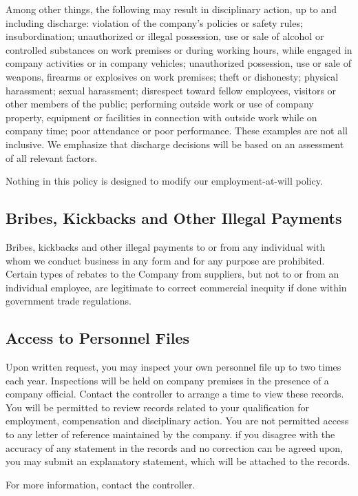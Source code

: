 Among other things, the following may result in disciplinary action, up to and including discharge: violation of the company's policies or safety rules; insubordination; unauthorized or illegal possession, use or sale of alcohol or controlled substances on work premises or during working hours, while engaged in company activities or in company vehicles; unauthorized possession, use or sale of weapons, firearms or explosives on work premises; theft or dishonesty; physical harassment; sexual harassment; disrespect toward fellow employees, visitors or other members of the public; performing outside work or use of company property, equipment or facilities in connection with outside work while on company time; poor attendance or poor performance. These examples are not all inclusive. We emphasize that discharge decisions will be based on an assessment of all relevant factors.

Nothing in this policy is designed to modify our employment-at-will policy.

\subsection{Bribes, Kickbacks and Other Illegal Payments}

Bribes, kickbacks and other illegal payments to or from any individual with whom we conduct business in any form and for any purpose are prohibited. Certain types of rebates to the Company from suppliers, but not to or from an individual employee, are legitimate to correct commercial inequity if done within government trade regulations.

\subsection{Access to Personnel Files}

Upon written request, you may inspect your own personnel file up to two times each year. Inspections will be held on company premises in the presence of a company official. Contact the controller to arrange a time to view these records. You will be permitted to review records related to your qualification for employment, compensation and disciplinary action. You are not permitted access to any letter of reference maintained by the company. if you disagree with the accuracy of any statement in the records and no correction can be agreed upon, you may submit an explanatory statement, which will be attached to the records.

For more information, contact the controller.

